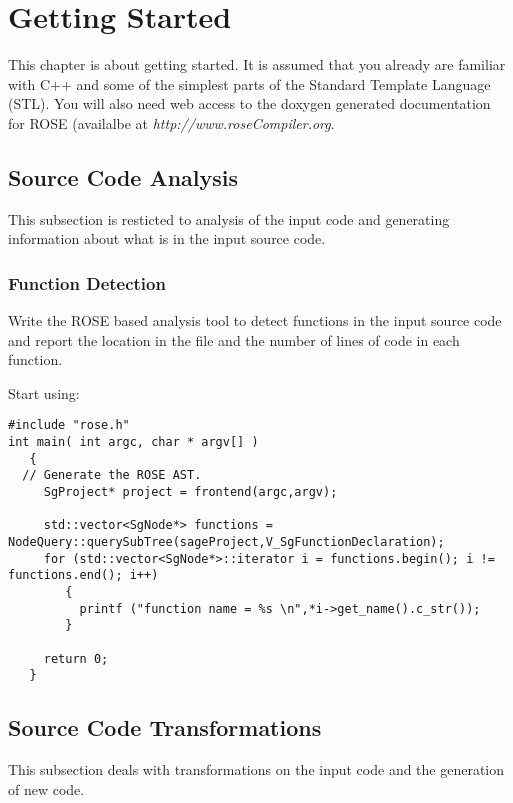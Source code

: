 \chapter{Getting Started}

  This chapter is about getting started.  It is assumed that
you already are familiar with C++ and some of the simplest parts
of the Standard Template Language (STL). You will also need web 
access to the doxygen generated documentation for ROSE (availalbe
at {\em http://www.roseCompiler.org}.

\section{Source Code Analysis}
   This subsection is resticted to analysis of the input code
and generating information about what is in the input source code.

\subsection{Function Detection}
   Write the ROSE based analysis tool to detect functions in the input source code
and report the location in the file and the number of lines of code in each function.

Start using:
\begin{verbatim}
#include "rose.h"
int main( int argc, char * argv[] )
   {
  // Generate the ROSE AST.
     SgProject* project = frontend(argc,argv);

     std::vector<SgNode*> functions = NodeQuery::querySubTree(sageProject,V_SgFunctionDeclaration);
     for (std::vector<SgNode*>::iterator i = functions.begin(); i != functions.end(); i++)
        {
          printf ("function name = %s \n",*i->get_name().c_str());
        }

     return 0;
   }

\end{verbatim}

\section{Source Code Transformations}
   This subsection deals with transformations on the 
input code and the generation of new code.

